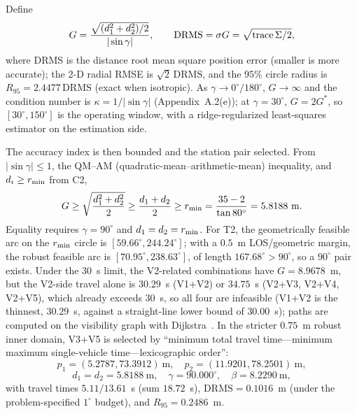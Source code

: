 Define
\begin{equation}
  G=\frac{\sqrt{(d_1^2+d_2^2)/2}}{|\sin\gamma|},\qquad
  \mathrm{DRMS}=\sigma G=\sqrt{\operatorname{trace}\Sigma/2},
\end{equation}
where DRMS is the distance root mean square position error (smaller is more accurate); the 2-D radial RMSE is $\sqrt2\,\mathrm{DRMS}$, and the $95\%$ circle radius is $R_{95}=2.4477\,\mathrm{DRMS}$ (exact when isotropic). As $\gamma\to0^\circ/180^\circ$, $G\to\infty$ and the condition number is $\kappa=1/|\sin\gamma|$ (Appendix~A.2(e)); at $\gamma=30^\circ$, $G=2G^*$, so $[30^\circ,150^\circ]$ is the operating window, with a ridge-regularized least-squares estimator on the estimation side.

The accuracy index is then bounded and the station pair selected. From $|\sin\gamma|\le1$, the QM--AM (quadratic-mean--arithmetic-mean) inequality, and $d_i\ge r_{\min}$ from C2,
\begin{equation}
  G\ge\sqrt{\frac{d_1^2+d_2^2}{2}}\ge\frac{d_1+d_2}{2}\ge r_{\min}=\frac{35-2}{\tan80^\circ}=5.8188~\mathrm{m}.
\end{equation}
Equality requires $\gamma=90^\circ$ and $d_1=d_2=r_{\min}$. For T2, the geometrically feasible arc on the $r_{\min}$ circle is $[59.66^\circ,244.24^\circ]$; with a $0.5$~m LOS/geometric margin, the robust feasible arc is $[70.95^\circ,238.63^\circ]$, of length $167.68^\circ>90^\circ$, so a $90^\circ$ pair exists. Under the 30~s limit, the V2-related combinations have $G=8.9678$~m, but the V2-side travel alone is $30.29$~s (V1+V2) or $34.75$~s (V2+V3, V2+V4, V2+V5), which already exceeds 30~s, so all four are infeasible (V1+V2 is the thinnest, $30.29$~s, against a straight-line lower bound of $30.00$~s); paths are computed on the visibility graph with Dijkstra~\cite{dijkstra}. In the stricter $0.75$~m robust inner domain, V3+V5 is selected by ``minimum total travel time---minimum maximum single-vehicle time---lexicographic order'':
\begin{equation}
  p_1=(5.2787,73.3912)~\mathrm{m},\quad p_2=(11.9201,78.2501)~\mathrm{m},
\end{equation}
\begin{equation}
  d_1=d_2=5.8188~\mathrm{m},\quad \gamma=90.000^\circ,\quad \beta=8.2290~\mathrm{m},
\end{equation}
with travel times $5.11/13.61$~s (sum $18.72$~s), $\mathrm{DRMS}=0.1016$~m (under the problem-specified $1^\circ$ budget), and $R_{95}=0.2486$~m.

